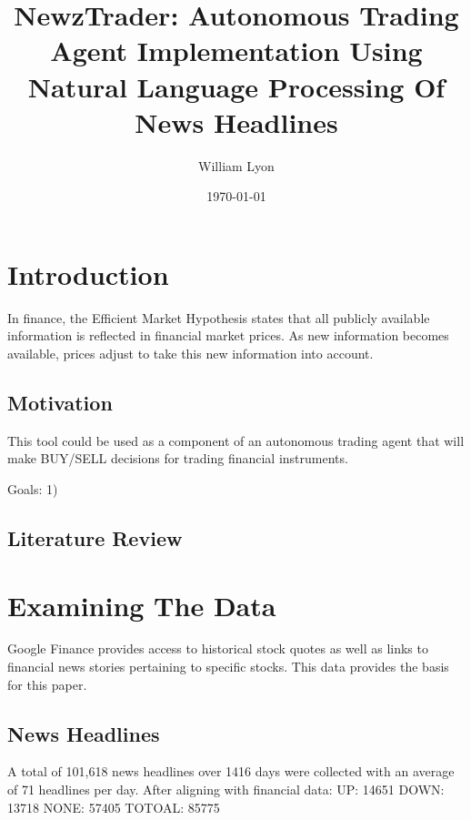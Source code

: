 \documentclass[twocolumn]{article}
\begin{document}
\title{NewzTrader: Autonomous Trading Agent Implementation Using Natural Language Processing Of News Headlines}
\author{William Lyon}
\date{\today}
\maketitle


\section{Introduction}
In finance, the Efficient Market Hypothesis states that all publicly available information is reflected in financial market prices.  As new information becomes available, prices adjust to take this new information into account.  
\subsection{Motivation}
This tool could be used as a component of an autonomous trading agent that will make BUY/SELL decisions for trading financial instruments.

Goals: 1) 
\subsection{Literature Review}

\section{Examining The Data}
Google Finance provides access to historical stock quotes as well as links to financial news stories pertaining to specific stocks. This data provides the basis for this paper.

\subsection{News Headlines}
A total of 101,618 news headlines over 1416 days were collected with an average of 71 headlines per day.  After aligning with financial data:
UP: 14651
DOWN: 13718
NONE: 57405
TOTOAL: 85775
\end{document}
